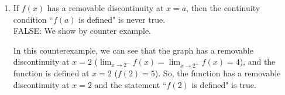 \documentclass[11pt]{article}
\begin{document}
\begin{enumerate}
\begin{enumerate}
\begin{center}
\end{center}

{
\color{blue}In this counterexample, we can see that the $\displaystyle \lim_{x \to -3}f(x)$ does not exist, but $\displaystyle \lim_{x \to -3^{+}}f(x)$ does exist even though $\displaystyle \lim_{x \to -3^{-}}f(x)$ does not. So, $\displaystyle \lim_{x \to 3} f(x)$ does not exist but $\displaystyle \lim_{x \to -3^{+}}f(x)$ does exist.
}

    \item If $f(x)$ has a removable discontinuity at $x=a$, then the continuity condition ``$f(a)$ is defined" is never true.
    \\
{
\color{blue}FALSE: We show by counter example.
}
\\
{
\color{Blue}

}
{
\color{blue}In this counterexample, we can see that the graph has a removable discontinuity at $x = 2$ ($\displaystyle \lim_{x \to 2^{-}}f(x) = \displaystyle \lim_{x \to 2^{+}}f(x) = 4$), and the function is defined at $x = 2$ ($f(2) = 5$). So, the function has a removable discontinuity at $x = 2$ and the statement ``$f(2)$ is defined" is true.
}
\end{enumerate}



\end{enumerate}
\end{document}
